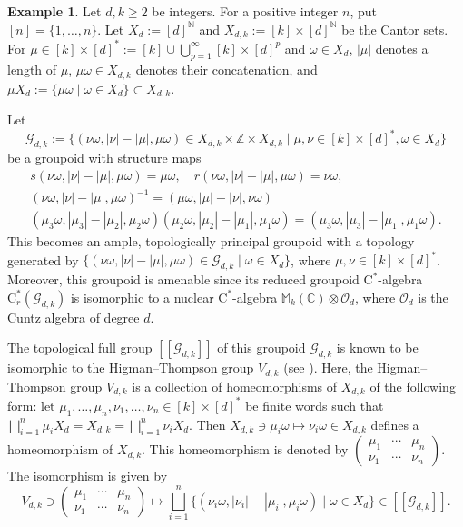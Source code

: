 \documentclass{amsart}
\newcommand{\G}{\mathcal{G}}
\theoremstyle{remark}
\theoremstyle{definition}
\newtheorem{example}[theorem]{Example}
\begin{document}
\begin{example}\label{Cuntzgrpd}
Let $d, k \geq 2$ be integers.
For a positive integer $n$, put $[n] = \{ 1 , \ldots , n \}$.
Let $X _d := [d]^{\mathbb{N}}$ and $X_{d, k} := [k] \times [d]^{\mathbb{N}}$ be the Cantor sets.
For $\mu \in [k] \times [d]^* := [k] \cup \bigcup_{p=1}^\infty [k] \times [d]^p$ and $\omega \in X_d$, $|\mu|$ denotes a length of $\mu$, $\mu \omega \in X_{d, k}$ denotes their concatenation, and $\mu X_d := \{ \mu \omega \mid \omega \in X_d \} \subset X_{d, k}$.

Let 
\[
\G _{d, k} := \{ (\nu \omega , |\nu| - |\mu|, \mu \omega) \in X_{d, k} \times \mathbb{Z} \times X_{d, k} \mid \mu, \nu \in [k] \times [d]^* , \omega \in X_d \}
\]
be a groupoid with structure maps
\begin{gather*}
s(\nu \omega , |\nu| - |\mu|, \mu \omega) = \mu \omega, \quad r(\nu \omega , |\nu| - |\mu|, \mu \omega) = \nu \omega, \\
(\nu \omega , |\nu| - |\mu|, \mu \omega)^{-1} = (\mu \omega, |\mu| - |\nu|, \nu \omega) \\
(\mu _3 \omega, |\mu_3|-|\mu_2|, \mu _2 \omega) (\mu _2 \omega, |\mu _2| - |\mu _1|, \mu _1 \omega) = (\mu _3 \omega, |\mu_3|-|\mu_1|, \mu _1 \omega).
\end{gather*}
This becomes an ample, topologically principal groupoid with a topology generated by $\{ (\nu \omega, | \nu | - | \mu |, \mu \omega) \in \G_{d, k} \mid \omega \in X_d \}$, where $\mu, \nu \in [k] \times [d]^*$.
Moreover, this groupoid is amenable since its reduced groupoid $\mathrm{C}^*$-algebra $\mathrm{C}^*_r(\G _{d, k})$ is isomorphic to a nuclear $\mathrm{C}^*$-algebra $\mathbb{M}_k (\mathbb{C}) \otimes \mathcal{O}_d$, where $\mathcal{O}_d$ is the Cuntz algebra of degree $d$.

The topological full group $[[ \G_{d, k} ]]$ of this groupoid $\G_{d, k}$ is known to be isomorphic to the Higman--Thompson group $V_{d, k}$ (see \cite[Remark 6.3 and Section 6.7.1]{Matui}).
Here, the Higman--Thompson group $V_{d, k}$ is a collection of homeomorphisms of $X_{d, k}$ of the following form: 
let $\mu _1, \ldots , \mu _n, \nu _1 , \ldots , \nu _n \in [k] \times [d]^*$ be finite words such that $\bigsqcup _{i=1}^n \mu _i X_d = X_{d, k} = \bigsqcup _{i=1}^n \nu _i X_d$.
Then $X_{d, k} \ni \mu _i \omega \mapsto \nu _i \omega \in X_{d, k}$ defines a homeomorphism of $X_{d, k}$.
This homeomorphism is denoted by 
$
\left(
\begin{smallmatrix} 
\mu_1 & \cdots & \mu _n \\
\nu _1 & \cdots & \nu _n 
\end{smallmatrix}
\right)
$.
The isomorphism is given by
\[
V_{d, k} \ni 
\left(
\begin{smallmatrix} 
\mu_1 & \cdots & \mu _n \\
\nu _1 & \cdots & \nu _n 
\end{smallmatrix}
\right)
\mapsto \bigsqcup _{i=1}^n \{ (\nu _i \omega , |\nu _i| - |\mu _i|, \mu _i \omega ) \mid \omega \in X_d \} \in [[ \G _{d, k} ]].
\]
\end{example}
\end{document}

